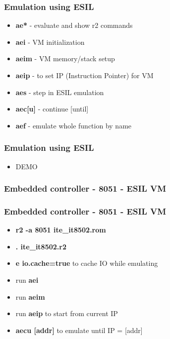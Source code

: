 \documentclass[10pt,pdf,utf8,english,compress,hyperref={unicode}]{beamer}
\begin{document}
\begin{frame}[fragile]
  \frametitle{Emulation using ESIL}
     \begin{itemize}
        \item \alert{\bf{ae*}} - evaluate and show r2 commands
		\item \alert{\bf{aei}} - VM initialization
		\item \alert{\bf{aeim}} - VM memory/stack setup
		\item \alert{\bf{aeip}} - to set IP (Instruction Pointer) for VM
		\item \alert{\bf{aes}} - step in ESIL emulation
		\item \alert{\bf{aec[u]}} - continue [until]
		\item \alert{\bf{aef}} - emulate whole function by name
      \end{itemize}
\end{frame}

\begin{frame}[fragile]
  \frametitle{Emulation using ESIL}
     \begin{itemize}
        \item DEMO
      \end{itemize}
\end{frame}

\begin{frame}[fragile]
\ifxetex
  \frametitle{Embedded controller - 8051 - ESIL VM}
\else
  \frametitle{Embedded controller - 8051 - ESIL VM }
\fi
  \begin{itemize}
	  \item \alert{\bf{r2 -a 8051 ite\_it8502.rom}}
	  \item \alert{\bf{. ite\_it8502.r2}}
	  \item \alert{\bf{e io.cache=true}} to cache IO while emulating
	  \item run \alert{\bf{aei}}
	  \item run \alert{\bf{aeim}}
	  \item run \alert{\bf{aeip}} to start from current IP
	  \item \alert{\bf{aecu [addr]}} to emulate until IP = [addr]
  \end{itemize}
\end{frame}

\end{document}
